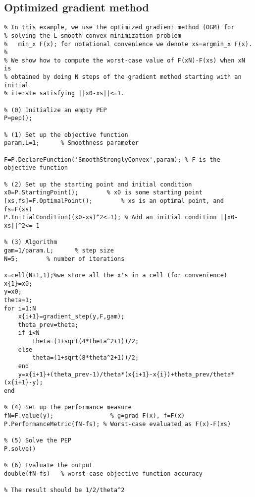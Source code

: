 \documentclass[11pt,a4paper]{article}
\begin{document}
\subsection{Optimized gradient method}
\begin{lstlisting}
% In this example, we use the optimized gradient method (OGM) for
% solving the L-smooth convex minimization problem
%   min_x F(x); for notational convenience we denote xs=argmin_x F(x).
%
% We show how to compute the worst-case value of F(xN)-F(xs) when xN is
% obtained by doing N steps of the gradient method starting with an initial
% iterate satisfying ||x0-xs||<=1.

% (0) Initialize an empty PEP
P=pep();

% (1) Set up the objective function
param.L=1;      % Smoothness parameter

F=P.DeclareFunction('SmoothStronglyConvex',param); % F is the objective function

% (2) Set up the starting point and initial condition
x0=P.StartingPoint();		 % x0 is some starting point
[xs,fs]=F.OptimalPoint(); 		 % xs is an optimal point, and fs=F(xs)
P.InitialCondition((x0-xs)^2<=1); % Add an initial condition ||x0-xs||^2<= 1

% (3) Algorithm
gam=1/param.L;		% step size
N=5;		% number of iterations

x=cell(N+1,1);%we store all the x's in a cell (for convenience)
x{1}=x0;
y=x0;
theta=1;
for i=1:N
    x{i+1}=gradient_step(y,F,gam);
    theta_prev=theta;
    if i<N
        theta=(1+sqrt(4*theta^2+1))/2;
    else
        theta=(1+sqrt(8*theta^2+1))/2;
    end
    y=x{i+1}+(theta_prev-1)/theta*(x{i+1}-x{i})+theta_prev/theta*(x{i+1}-y);
end

% (4) Set up the performance measure
fN=F.value(y);                % g=grad F(x), f=F(x)
P.PerformanceMetric(fN-fs); % Worst-case evaluated as F(x)-F(xs)

% (5) Solve the PEP
P.solve()

% (6) Evaluate the output
double(fN-fs)   % worst-case objective function accuracy

% The result should be 1/2/theta^2
\end{lstlisting}
\newpage
\end{document}
